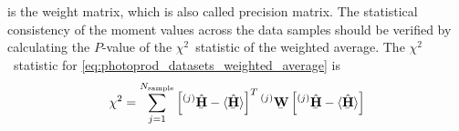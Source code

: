 is the weight matrix, which is also called precision matrix.  The
statistical consistency of the moment values across the data samples
should be verified by calculating the $P$-value of the
$\chi^2$~statistic of the weighted average.  The $\chi^2$~statistic
for \cref{eq:photoprod_datasets_weighted_average} is
\begin{equation}
  \chi^2
  = \sum_{j = 1}^{N_\text{sample}}
  \sBrk[2]{\prescript{(j)}{}{\vphantom{\vect{H}}}\underaccent{\bar}{\hat{\vect{H}}} - \mean{\underaccent{\bar}{\hat{\vect{H}}}}}^T
  \prescript{(j)}{}{\underaccent{\bar}{\mat{W}}}
  \sBrk[2]{\prescript{(j)}{}{\vphantom{\vect{H}}}\underaccent{\bar}{\hat{\vect{H}}} - \mean{\underaccent{\bar}{\hat{\vect{H}}}}}
\end{equation}


